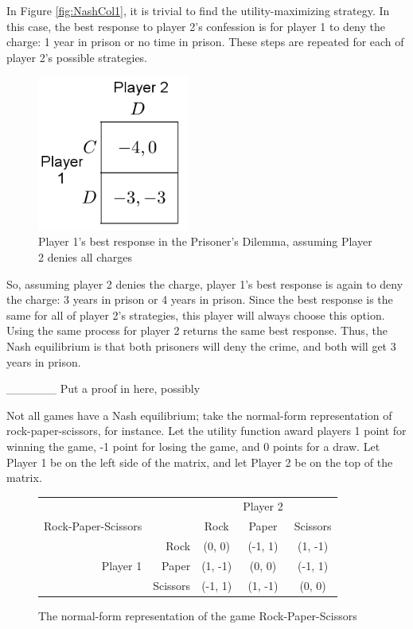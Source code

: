 In Figure \ref{fig:NashCol1}, it is trivial to find the utility-maximizing strategy. In this case, the best response to player 2's confession is for player 1 to deny the charge: 1 year in prison or no time in prison. These steps are repeated for each of player 2's possible strategies.
\begin{figure}[h]
  \centering
  \includegraphics[width=5cm]{figures/ExamplePartialGrid2.png}
  \caption{Player 1's best response in the Prisoner's Dilemma, assuming Player 2 denies all charges}
  \label{fig:NashCol2}
\end{figure}
So, assuming player 2 denies the charge, player 1's best response is again to deny the charge: 3 years in prison or 4 years in prison. Since the best response is the same for all of player 2's strategies, this player will always choose this option. Using the same process for player 2 returns the same best response. Thus, the Nash equilibrium is that both prisoners will deny the crime, and both will get 3 years in prison.

\_\_\_\_\_\_ Put a proof in here, possibly

Not all games have a Nash equilibrium; take the normal-form representation of rock-paper-scissors, for instance. Let the utility function award players 1 point for winning the game, -1 point for losing the game, and 0 points for a draw. Let Player 1 be on the left side of the matrix, and let Player 2 be on the top of the matrix.
\begin{figure}[H]
  \centering
  \begin{tabular}{r r | c | c | c |}
    &\multicolumn{1}{c}{}&\multicolumn{1}{c}{}&\multicolumn{1}{c}{Player 2}&\multicolumn{1}{c}{}\\
    Rock-Paper-Scissors &\multicolumn{1}{c}{}&\multicolumn{1}{c}{Rock}&\multicolumn{1}{c}{Paper}&\multicolumn{1}{c}{Scissors} \\ \cline{3-5}
    & Rock & (0, 0) & (-1, 1) & (1, -1) \\ \cline{3-5}
    Player 1 & Paper & (1, -1) & (0, 0) & (-1, 1) \\ \cline{3-5}
    & Scissors & (-1, 1) & (1, -1) & (0, 0) \\ \cline{3-5}
  \end{tabular}
  \caption{The normal-form representation of the game Rock-Paper-Scissors}
  \label{fig:RPS}
\end{figure}

